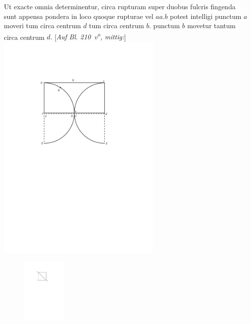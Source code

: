 \pend
\vspace*{1.5em}%
\pstart%
Ut exacte omnia determinentur, circa rupturam\protect{} super duobus fulcris\protect{} fingenda sunt appensa pondera in loco quoque rupturae\protect{}  vel $aa.b$ potest intelligi punctum $a$ moveri tum circa centrum $d$ tum circa centrum $b.$ punctum $b$ movetur tantum circa centrum $d.$
\pend
\vspace*{1.5em}%
\pstart%
\noindent%
[\textit{Auf Bl. 210~v\textsuperscript{o}, mittig:}]
\pend
\vspace*{1.0em}%
\pstart%
\noindent%
\centering%
\includegraphics[width=0.61\textwidth]{images/lh03705_210v-d1.pdf}\\
\pend
\newpage%
\pstart%
\begin{figure}
\vspace{-5mm}
\includegraphics[trim = 0mm 0mm -5mm 0mm, clip, width=0.2\textwidth]{images/lh03705_210v-d2.pdf}\\
\end{figure}
